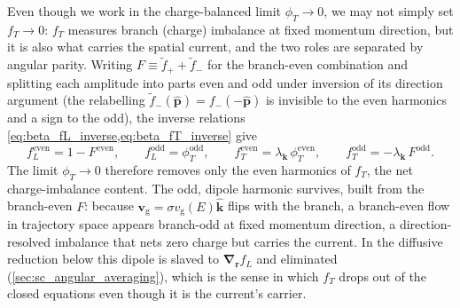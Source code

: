 \documentclass[
  aps,
  prb,
  preprint,
  superscriptaddress,
  longbibliography,
  nofootinbib
]{revtex4-2}
\newcommand{\br}{\mathbf{r}}
\newcommand{\bk}{\mathbf{k}}
\newcommand{\bp}{\mathbf{p}}
\newcommand{\bnabla}{\boldsymbol{\nabla}}
\newcommand{\vg}{v_{\mathrm{g}}}
\newcommand{\fL}{f_L}
\newcommand{\fT}{f_T}
\newcommand{\bvg}{\mathbf{v}_{\mathrm{g}}}
\begin{document}
Even though we work in the charge-balanced limit \(\phi_T\to0\), we
may not simply set \(\fT\to0\): \(\fT\) measures branch (charge)
imbalance at fixed momentum direction, but it is also what carries
the spatial current, and the two roles are separated by angular
parity. Writing
\(F\equiv\widetilde f_++\widetilde f_-\) for the branch-even
combination and splitting each amplitude into parts even and odd under
inversion of its direction argument (the relabelling
\(\widetilde f_-(\hat{\bp})=f_-(-\hat{\bp})\) is invisible to the even
harmonics and a sign to the odd), the inverse relations
\cref{eq:beta_fL_inverse,eq:beta_fT_inverse} give
\begin{equation}
  \fL^{\mathrm{even}}=1-F^{\mathrm{even}},
  \qquad
  \fL^{\mathrm{odd}}=\phi_T^{\mathrm{odd}},
  \qquad
  \fT^{\mathrm{even}}=\lambda_{\bk}\,\phi_T^{\mathrm{even}},
  \qquad
  \fT^{\mathrm{odd}}=-\lambda_{\bk}\,F^{\mathrm{odd}}.
  \label{eq:intro_parity_dictionary}
\end{equation}
The limit \(\phi_T\to0\) therefore removes only the even harmonics of
\(\fT\), the net charge-imbalance content. The odd, dipole harmonic
survives, built from the branch-even \(F\): because
\(\bvg=\sigma\vg(E)\hat{\bk}\) flips with the branch, a branch-even
flow in trajectory space appears branch-odd at fixed momentum
direction, a direction-resolved imbalance that nets zero charge but
carries the current. In the diffusive reduction below this dipole is
slaved to \(\bnabla_{\br}\fL\) and eliminated
(\cref{sec:sc_angular_averaging}), which is the sense in which \(\fT\)
drops out of the closed equations even though it is the current's
carrier.
\end{document}
